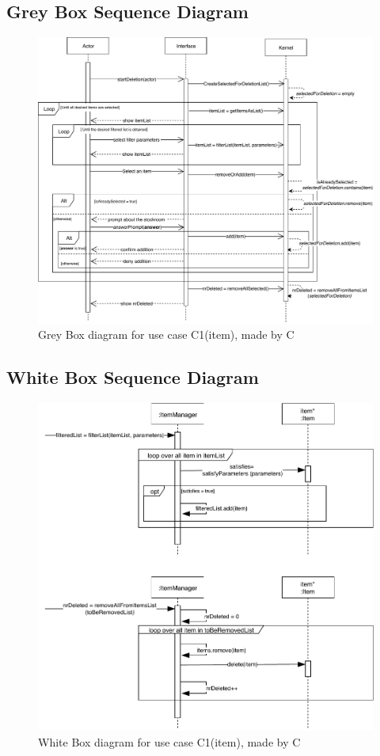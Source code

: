 \subsection*{Grey Box Sequence Diagram}
\begin{figure}[H]
	\centering
	\includegraphics[scale=.9]{uml/SD-gb-delete.pdf}
	\caption*{Grey Box diagram for use case C1(item), made by C}
\end{figure}
\subsection*{White Box Sequence Diagram}
\begin{figure}[H]
	\centering
	\includegraphics[scale=.85]{uml/SD-wb-delete.pdf}
	\caption*{White Box diagram for use case C1(item), made by C}
\end{figure}